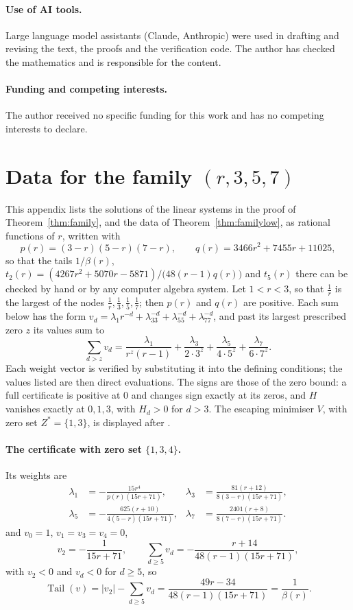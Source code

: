 \documentclass[11pt]{article}
\DeclareMathOperator{\Tail}{Tail}
\begin{document}
\paragraph{Use of AI tools.}
Large language model assistants (Claude, Anthropic) were used in drafting
and revising the text, the proofs and the verification code.  The author has checked the mathematics and is responsible
for the content.

\paragraph{Funding and competing interests.}
The author received no specific funding for this work and has no competing
interests to declare.

\appendix

\section{Data for the family \texorpdfstring{$(r,3,5,7)$}{(r,3,5,7)}}\label{sec:familydata}

This appendix lists the solutions of the linear systems in the proof of
Theorem~\ref{thm:family}, and the data of Theorem~\ref{thm:familylow}, as
rational functions of $r$, written with
\[
  p(r)=(3-r)(5-r)(7-r),\qquad q(r)=3466r^2+7455r+11025 ,
\]
so that the tails $1/\beta(r)$,
$t_2(r)=(4267r^2+5070r-5871)/\bigl(48(r-1)q(r)\bigr)$ and $t_5(r)$ there can be checked
by hand or by any computer algebra system.  Let $1<r<3$, so that
$\tfrac1r$ is the largest of the nodes
$\tfrac1r,\tfrac13,\tfrac15,\tfrac17$; then $p(r)$ and $q(r)$ are positive.  Each sum below has the form
$v_d=\lambda_1r^{-d}+\lambda_33^{-d}+\lambda_55^{-d}+\lambda_77^{-d}$, and
past its largest prescribed zero $z$ its values sum to
\[
  \sum_{d>z}v_d=\frac{\lambda_1}{r^{z}(r-1)}+\frac{\lambda_3}{2\cdot3^{z}}
  +\frac{\lambda_5}{4\cdot5^{z}}+\frac{\lambda_7}{6\cdot7^{z}} .
\]
Each weight vector is verified by substituting it into the defining
conditions; the values listed are then direct evaluations.  The signs are
those of the zero bound: a full certificate is positive at $0$ and changes
sign exactly at its zeros, and $H$ vanishes exactly at $0,1,3$, with
$H_d>0$ for $d>3$.  The escaping minimiser $V$, with zero set $Z^*=\{1,3\}$,
is displayed after \cite[Theorem~4.3]{coefficient-mass-attainment}.

\paragraph{The certificate with zero set $\{1,3,4\}$.}  Its weights are
\[
  \begin{aligned}
  \lambda_1&=-\frac{15r^4}{p(r)(15r+71)},&
  \lambda_3&=\frac{81(r+12)}{8(3-r)(15r+71)},\\
  \lambda_5&=-\frac{625(r+10)}{4(5-r)(15r+71)},&
  \lambda_7&=\frac{2401(r+8)}{8(7-r)(15r+71)}.
  \end{aligned}
\]
and $v_0=1$, $v_1=v_3=v_4=0$,
\[
  v_2=-\frac1{15r+71},\qquad
  \sum_{d\ge5}v_d=-\frac{r+14}{48(r-1)(15r+71)},
\]
with $v_2<0$ and $v_d<0$ for $d\ge5$, so
\[
  \Tail(v)=|v_2|-\sum_{d\ge5}v_d=\frac{49r-34}{48(r-1)(15r+71)}=\frac1{\beta(r)}.
\]
\end{document}
